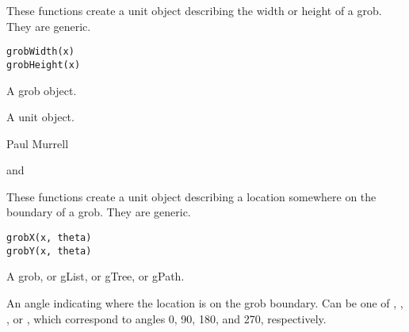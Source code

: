 %
\begin{Description}\relax
These functions create a unit object describing the width or height of
a grob.  They are generic.
\end{Description}
%
\begin{Usage}
\begin{verbatim}
grobWidth(x)
grobHeight(x)
\end{verbatim}
\end{Usage}
%
\begin{Arguments}
\begin{ldescription}
\item[\code{x}] A grob object.
\end{ldescription}
\end{Arguments}
%
\begin{Value}
A unit object. 
\end{Value}
%
\begin{Author}\relax
Paul Murrell
\end{Author}
%
\begin{SeeAlso}\relax
{} and
\end{SeeAlso}
%
\begin{Description}\relax
These functions create a unit object describing a location somewhere
on the boundary of
a grob.  They are generic.
\end{Description}
%
\begin{Usage}
\begin{verbatim}
grobX(x, theta)
grobY(x, theta)
\end{verbatim}
\end{Usage}
%
\begin{Arguments}
\begin{ldescription}
\item[\code{x}] A grob, or gList, or gTree, or gPath.
\item[\code{theta}] An angle indicating where the location is
on the grob boundary.  Can be one of ,
, , or ,
which correspond to angles 0, 90, 180, and 270,
respectively.
\end{ldescription}
\end{Arguments}
%
